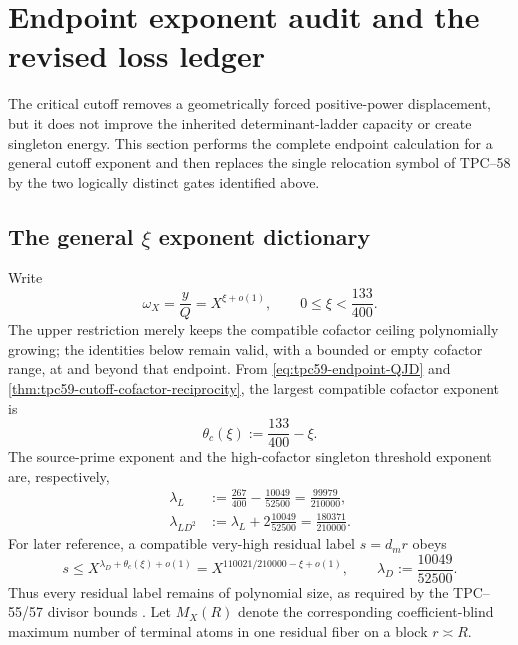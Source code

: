 \section{Endpoint exponent audit and the revised loss ledger}
\label{sec:tpc59-endpoint}

The critical cutoff removes a geometrically forced positive-power
displacement, but it does not improve the inherited determinant-ladder
capacity or create singleton energy.  This section performs the complete
endpoint calculation for a general cutoff exponent and then replaces the
single relocation symbol of TPC--58 by the two logically distinct gates
identified above.

\subsection{The general \texorpdfstring{\(\xi\)}{xi} exponent dictionary}

Write
\begin{equation}
 \omega_X=\frac yQ=X^{\xi+o(1)},
 \qquad 0\le\xi<\frac{133}{400}.
 \label{eq:tpc59-endpoint-xi}
\end{equation}
The upper restriction merely keeps the compatible cofactor ceiling
polynomially growing; the identities below remain valid, with a bounded or
empty cofactor range, at and beyond that endpoint.  From
\eqref{eq:tpc59-endpoint-QJD} and
\cref{thm:tpc59-cutoff-cofactor-reciprocity}, the largest compatible
cofactor exponent is
\begin{equation}
 \theta_c(\xi)
 :=\frac{133}{400}-\xi.
 \label{eq:tpc59-critical-cofactor-exponent}
\end{equation}
The source-prime exponent and the high-cofactor singleton threshold
exponent are, respectively,
\begin{align}
 \lambda_L
 &:=\frac{267}{400}-\frac{10049}{52500}
   =\frac{99979}{210000},
 \label{eq:tpc59-endpoint-lambda-L}\\
 \lambda_{LD^2}
 &:=\lambda_L+2\frac{10049}{52500}
   =\frac{180371}{210000}.
 \label{eq:tpc59-endpoint-lambda-LD2}
\end{align}
For later reference, a compatible very-high residual label \(s=d_mr\)
obeys
\begin{equation}
 s\le X^{\lambda_D+\theta_c(\xi)+o(1)}
  =X^{110021/210000-\xi+o(1)},
 \qquad \lambda_D:=\frac{10049}{52500}.
 \label{eq:tpc59-compatible-residual-exponent}
\end{equation}
Thus every residual label remains of polynomial size, as required by the
TPC--55/57 divisor bounds \citep{WangTPC55,WangTPC57}.
Let \(M_X(R)\) denote the corresponding coefficient-blind maximum number
of terminal atoms in one residual fiber on a block \(r\asymp R\).


